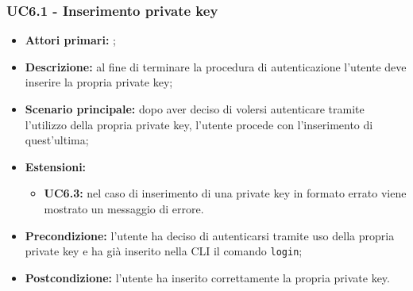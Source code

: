 \subsubsection{UC6.1 - Inserimento private key }
\begin{itemize}
	\item \textbf{Attori primari:} \una{};
	\item \textbf{Descrizione:} al fine di terminare la procedura di autenticazione l’utente deve inserire la propria private key;
	\item \textbf{Scenario principale:} dopo aver deciso di volersi autenticare tramite l’utilizzo della propria private key, l’utente procede con l’inserimento di quest’ultima;  
	\item \textbf{Estensioni:} 
	\begin{itemize}
		\item \textbf{UC6.3:} nel caso di inserimento di una private key in formato errato viene mostrato un messaggio di errore.
	\end{itemize}
	\item \textbf{Precondizione:} l’utente ha deciso di autenticarsi tramite uso della propria private key e ha già inserito nella CLI il comando \texttt{login}; 
	\item \textbf{Postcondizione:} l’utente ha inserito correttamente la propria private key. 
\end{itemize}
